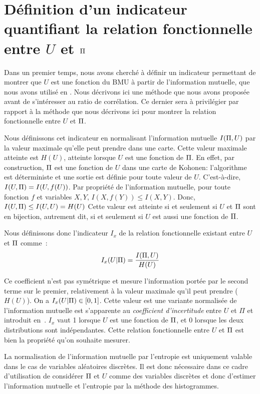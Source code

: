 \documentclass[../main]{subfiles}
\begin{document}
\section{Définition d'un indicateur quantifiant la relation fonctionnelle entre $U$ et $\Pi$}

Dans un premier temps, nous avons cherché à définir un indicateur permettant de montrer que $U$ est une fonction du BMU à partir de l'information mutuelle, que nous avons utilisé en \cite{Gonnier2020ConsensusDS}. 
Nous décrivons ici une méthode que nous avons proposée avant de s'intéresser au ratio de corrélation. Ce dernier sera à privilégier par rapport à la méthode que nous décrivons ici pour montrer la relation fonctionnelle entre $U$ et $\Pi$. 

Nous définissons cet indicateur en normalisant l'information mutuelle $I(\Pi,U)$  par la valeur maximale qu'elle peut prendre dans une carte. Cette valeur maximale atteinte est $H(U)$, atteinte lorsque $U$ est une fonction de $\Pi$.
En effet, par construction, $\Pi$ est une fonction de $U$ dans une carte de Kohonen: l'algorithme est déterministe et une sortie est définie pour toute valeur de $U$. C'est-à-dire, $I(U,\Pi) = I (U, f(U))$.
Par propriété de l'information mutuelle, pour toute fonction $f$ et variables $X,Y$, $I(X,f(Y)) \leq I(X,Y) $. 
Donc, $I(U,\Pi) \leq I(U,U) = H(U)$
Cette valeur est atteinte si et seulement si $U$ et $\Pi$ sont en bijection, autrement dit, si et seulement si $U$ est aussi une fonction de $\Pi$.

Nous définissons donc l'indicateur $I_x$ de la relation fonctionnelle existant entre $U$ et $\Pi$ comme~:
\begin{equation}
I_x(U|\Pi) = \frac{I(\Pi,U)}{H(U)}
\end{equation}

Ce coefficient n'est pas symétrique et mesure l'information portée par le second terme sur le premier, relativement à la valeur maximale qu'il peut prendre ($H(U)$). On a $I_x(U|\Pi) \in [0,1]$. Cette valeur est une variante normalisée de l'information mutuelle est s'apparente au \emph{coefficient d'incertitude} entre $U$ et $\Pi$ et introduit en~\cite{Theil1961EconomicFA}.
$I_x$ vaut 1 lorsque $U$ est une fonction de $\Pi$, et $0$ lorsque les deux distributions sont indépendantes. Cette relation fonctionnelle entre $U$ et $\Pi$ est bien la propriété qu'on souhaite mesurer.

La normalisation de l'information mutuelle par l'entropie est uniquement valable dans le cas de variables aléatoires discrètes. Il est donc nécessaire dans ce cadre d'utilisation de considérer $\Pi$ et $U$ comme des variables discrètes et donc d'estimer l'information mutuelle et l'entropie par la méthode des histogrammes.
\end{document}
